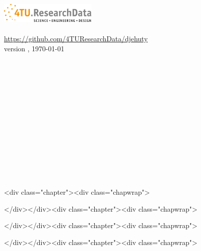 \documentclass[12pt,a4paper]{book}
\begin{document}
{{\begin{titlepage}
\begin{center}
      \includegraphics[width=0.35\textwidth]{figures/logo.pdf}
      ~\\~\\
      \url{https://github.com/4TUResearchData/djehuty}~\\
       version \djehutyversion{}, \today{}
       ~\\~\\~\\~\\~\\~\\~\\~\\~\\~\\~\\~\\~\\~\\
       \vspace*{\fill}
    \fi
  \end{center}
  \thispagestyle{empty}
\end{titlepage}

\setcounter{page}{1}
\hypersetup{linkcolor=black}

\ifdefined\HCode
\begin{html}
<div class="chapter"><div class="chapwrap">
\end{html}
\fi

\tableofcontents

\ifdefined\HCode
\begin{html}
</div></div><div class="chapter"><div class="chapwrap">
\end{html}
\fi

\listoffigures
\newpage{}
\hypersetup{linkcolor=LinkGray}
\setcounter{page}{1}

\ifdefined\HCode
\begin{html}
</div></div><div class="chapter"><div class="chapwrap">
\end{html}
\fi



\ifdefined\HCode
\begin{html}
</div></div><div class="chapter"><div class="chapwrap">
\end{html}
\fi

}}
\end{document}
